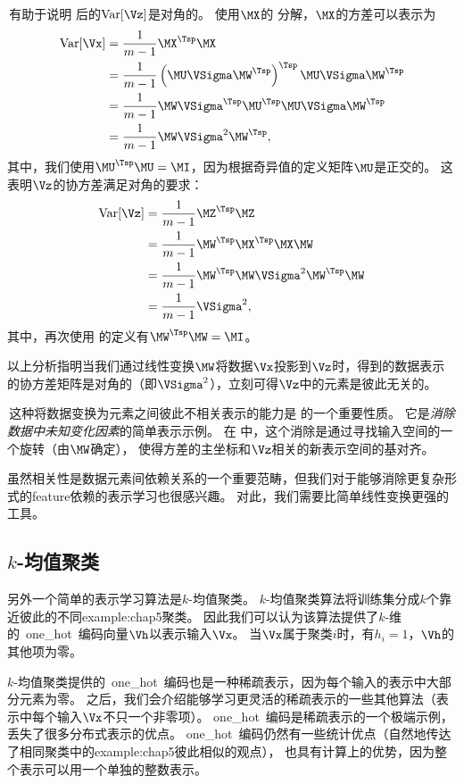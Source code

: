 
\,有助于说明\,\,后的$\text{Var}[\Vz]$是对角的。
使用$\MX$的\,\,分解，$\MX$的方差可以表示为
\begin{align}
    \text{Var}[\Vx] &= \frac{1}{m-1} \MX^\Tsp\MX \\
    &= \frac{1}{m-1} \left( \MU\VSigma \MW^\Tsp \right)^\Tsp \MU\VSigma \MW^\Tsp \\
    &= \frac{1}{m-1} \MW \VSigma^\Tsp \MU^\Tsp \MU\VSigma \MW^\Tsp \\
    &= \frac{1}{m-1} \MW \VSigma^2 \MW^\Tsp ,
\end{align}
其中，我们使用$\MU^\Tsp\MU = \MI$，因为根据奇异值的定义矩阵$\MU$是正交的。
这表明$\Vz$的协方差满足对角的要求：
\begin{align}
    \text{Var}[\Vz] &= \frac{1}{m-1} \MZ^\Tsp\MZ \\
    &= \frac{1}{m-1} \MW^\Tsp \MX^\Tsp \MX \MW \\
    &= \frac{1}{m-1} \MW^\Tsp\MW \VSigma^2 \MW^\Tsp\MW \\
    &= \frac{1}{m-1} \VSigma^2 ,
\end{align}
其中，再次使用\,\,的定义有$\MW^\Tsp\MW = \MI$。

以上分析指明当我们通过线性变换$\MW$将数据$\Vx$投影到$\Vz$时，得到的数据表示的协方差矩阵是对角的（即$\VSigma^2$），立刻可得$\Vz$中的元素是彼此无关的。

\,这种将数据变换为元素之间彼此不相关表示的能力是\,\,的一个重要性质。
它是\emph{消除数据中未知变化因素}的简单表示示例。
在\,\,中，这个消除是通过寻找输入空间的一个旋转（由$\MW$确定），
使得方差的主坐标和$\Vz$相关的新表示空间的基对齐。


虽然相关性是数据元素间依赖关系的一个重要范畴，但我们对于能够消除更复杂形式的\gls{feature}依赖的表示学习也很感兴趣。
对此，我们需要比简单线性变换更强的工具。

\subsection{$k$-均值聚类}
\label{sec:k_means_clustering}
另外一个简单的表示学习算法是$k$-均值聚类。
$k$-均值聚类算法将训练集分成$k$个靠近彼此的不同\gls{example:chap5}聚类。
因此我们可以认为该算法提供了$k$-维的~\gls{one_hot}~编码向量$\Vh$以表示输入$\Vx$。
当$\Vx$属于聚类$i$时，有$h_i=1$，$\Vh$的其他项为零。

$k$-均值聚类提供的~\gls{one_hot}~编码也是一种稀疏表示，因为每个输入的表示中大部分元素为零。
之后，我们会介绍能够学习更灵活的稀疏表示的一些其他算法（表示中每个输入$\Vx$不只一个非零项）。
\gls{one_hot}~编码是稀疏表示的一个极端示例，丢失了很多分布式表示的优点。
\gls{one_hot}~编码仍然有一些统计优点（自然地传达了相同聚类中的\gls{example:chap5}彼此相似的观点），
也具有计算上的优势，因为整个表示可以用一个单独的整数表示。

